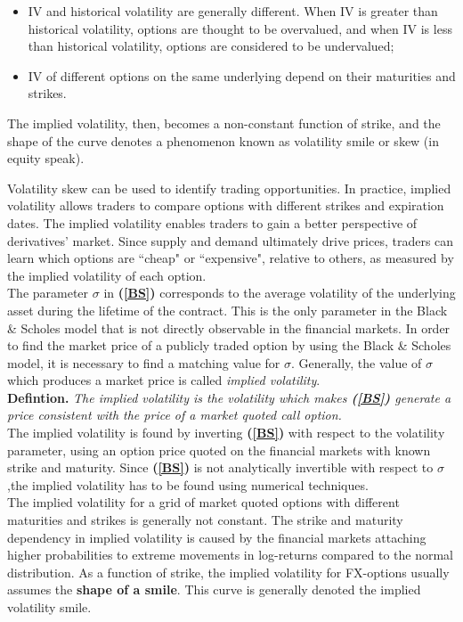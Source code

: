 \documentclass[a4paper, 12pt]{article}
\numberwithin{equation}{subsection}
\begin{document}
\begin{itemize}
\item IV and historical volatility are generally different. When IV is greater than historical volatility, options are thought to be overvalued, and when IV is
less than historical volatility, options are considered to be undervalued;
\item IV of different options on the same underlying depend on their maturities
and strikes.
\end{itemize}

The implied volatility, then, becomes a non-constant function of strike, and the shape of the curve denotes a phenomenon known as volatility smile or skew (in equity speak).

Volatility skew can be used to identify trading opportunities. In practice, implied volatility allows traders to compare options with different strikes and expiration dates. The implied volatility enables traders to gain a better perspective of derivatives' market. Since supply and demand ultimately drive prices, traders
can learn which options are ``cheap" or ``expensive", relative to others, as measured by the implied volatility of each option.
\\

The parameter $\sigma$ in \textbf{(\ref{BS})} corresponds to the average volatility of the underlying asset during the lifetime of the contract. This is the only parameter in the Black  \& Scholes model that is not directly observable in the financial markets. In order to find the market price of a publicly traded option by using the Black \& Scholes model, it is necessary to find a matching value for $\sigma$. Generally, the value of $\sigma$ which produces a market price is called \textit{implied volatility}.\\


\textbf{Defintion. }\textit{The implied volatility is the volatility which makes \textbf{(\ref{BS})} generate a price consistent with the price of a market quoted call option.}\\

The implied volatility is found by inverting \textbf{(\ref{BS})} with respect to the volatility parameter, using an option price quoted on the financial markets with known strike and maturity. Since \textbf{(\ref{BS})} is not analytically invertible with respect to $\sigma$,the implied volatility has to be found using numerical techniques.\\

The implied volatility for a grid of market quoted options with different maturities and strikes is generally not constant. The strike and maturity dependency in implied volatility is caused by the financial markets attaching higher probabilities to extreme movements in log-returns compared to the normal distribution. As a function of strike, the implied volatility for FX-options usually assumes the \textbf{shape of a smile}. This curve is generally denoted the implied volatility smile.\\
\end{document}
